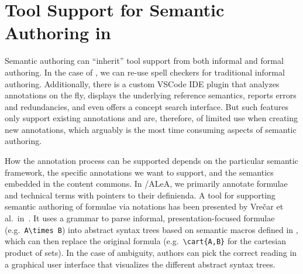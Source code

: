 \documentclass{llncs}
\newcommand\ALeA{\textsf{ALeA}\xspace}
\begin{document}


\section{Tool Support for Semantic Authoring in \sTeX}\label{sec:tools}
Semantic authoring can ``inherit'' tool support from both informal
and formal authoring.
In the case of \sTeX, we can re-use spell checkers for traditional informal authoring.
Additionally, there is a custom VSCode IDE plugin \cite{sTeX-IDE:git} that
analyzes annotations on the fly, displays the underlying reference semantics, reports
errors and redundancies, and even offers a concept search interface.
But such features only support existing annotations and are, therefore,
of limited use when creating new annotations, which arguably is the
most time consuming aspects of semantic authoring.

How the annotation process can be supported depends on the particular semantic framework,
the specific annotations we want to support, and the semantics embedded in the content commons.
In \sTeX/\ALeA, we primarily annotate formulae and technical terms with pointers to their definienda.
A tool for supporting semantic authoring of formulae via notations has been presented by Vre{\v{c}}ar et al.\ in~\cite{VreWelKam:tsmmdui24}.
It uses a grammar to parse informal, presentation-focused formulae (e.g.\ \lstinline[keywordstyle={}]|A\times B|) into abstract syntax trees based on
semantic macros defined in \sTeX, which can then replace the original formula
(e.g.\ \lstinline|\cart{A,B}| for the cartesian product of sets).
In the case of ambiguity, authors can pick the correct reading in a
graphical user interface that visualizes the different abstract syntax trees.
\end{document}
